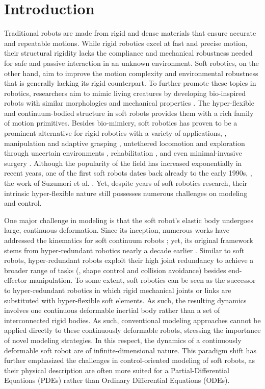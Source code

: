 \section{Introduction}
\label{sec: chap1 1_introduction}
Traditional robots are made from rigid and dense materials that ensure accurate and repeatable motions. While rigid robotics excel at fast and precise motion, their structural rigidity lacks the compliance and mechanical robustness needed for safe and passive interaction in an unknown environment. Soft robotics, on the other hand, aim to improve the motion complexity and environmental robustness that is generally lacking its rigid counterpart. To further promote these topics in robotics, researchers aim to mimic living creatures by developing bio-inspired robots with similar morphologies and mechanical properties \cite{Falkenhahn2015,Suzumori1991,Godage2015,Godage2016,Marchese2014,Kriegman2019}.
The hyper-flexible and continuum-bodied structure in soft robots provides them with a rich family of motion primitives. Besides bio-mimicry, soft robotics has proven to be a prominent alternative for rigid robotics with a variety of applications, \eg, manipulation and adaptive grasping \cite{Galloway2016}, untethered locomotion and exploration through uncertain environments \cite{Marchese2014,Choi2011,Pilz2020}, rehabilitation \cite{Polygerinos2015}, and even minimal-invasive surgery \cite{Li2017a,Cianchetti2014}. Although the popularity of the field has increased exponentially in recent years, one of the first soft robots dates back already to the early 1990s, \eg, the work of Suzumori et al. \cite{Suzumori1991}. Yet, despite years of soft robotics research, their intrinsic hyper-flexible nature still possesses numerous challenges on modeling and control.

One major challenge in modeling is that the soft robot's elastic body undergoes large, continuous deformation. Since its inception, numerous works have addressed the kinematics for soft continuum robots \cite{Jones2006,Mochiyama1999,Mochiyama2003}; yet, its original framework stems from hyper-redundant robotics nearly a decade earlier \cite{Chirikjian1994}. Similar to soft robots, hyper-redundant robots exploit their high joint redundancy to achieve a broader range of tasks (\eg, shape control and collision avoidance) besides end-effector manipulation. To some extent, soft robotics can be seen as the successor to hyper-redundant robotics in which rigid mechanical joints or links are substituted with hyper-flexible soft elements. As such, the resulting dynamics involves one continuous deformable inertial body rather than a set of interconnected rigid bodies. As such, conventional modeling approaches cannot be applied directly to these continuously deformable robots, stressing the importance of novel modeling strategies. In this respect, the dynamics of a continuously deformable soft robot are of infinite-dimensional nature. This paradigm shift has further emphasized the challenges in control-oriented modeling of soft robots, as their physical description are often more suited for a Partial-Differential Equations (PDEs) rather than Ordinary Differential Equations (ODEs).

